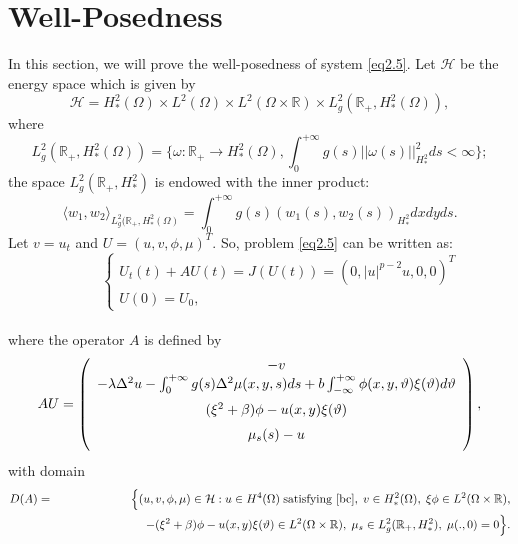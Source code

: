 \documentclass[12pt]{article}
\numberwithin{equation}{section}
\begin{document}
\section{Well-Posedness}
In this section, we will prove the well-posedness of system \eqref{eq2.5}.
Let $\mathcal{H}$ be the energy space which is given by
$$
\mathcal{H}=H^2_{*}(\Omega) \times L^{2}(\Omega) \times L^{2}(\Omega \times \mathbb{R}) \times L_g^2 (\mathbb{R}_+, H^2_{*} (\Omega)),
$$
where
$$
L_g^2 (\mathbb{R}_+, H^2_{*} (\Omega)) = \Biggl\{\omega : \mathbb{R}_+ \to H^2_{*} (\Omega), \int_{0}^{+\infty} g(s) ||\omega(s)||^2_{H^2_{*}} ds < \infty    \Biggl\};
$$
the space $L_g^2 (\mathbb{R}_+, H^2_{*})$ is endowed with the inner product:
$$
\bigl \langle w_1,w_2 \bigr \rangle_{L_g^2 (\mathbb{R}_+, H^2_{*} (\Omega)} =  \int_{0}^{+\infty} g(s) ( w_1 (s),  w_2 (s))_{H^2_{*}} dx dy ds.
$$
Let $v=u_t$ and $U = (u,v,\phi,\mu)^T.$ So, problem \eqref{eq2.5} can be written as:\\
 \vspace{4mm}
 \hspace{20mm}
 \begin{equation}
 \quad \quad \quad  \left\{
\begin{array}{lr}
U_t(t) + AU(t) = J(U(t))= (0, |u|^{p-2} u, 0, 0)^{T} \\
U(0) = U_0,
\label{A1}
\end{array}
\right.
\end{equation}
\\where the operator ${A}$ is defined by
\vspace{-.5 em}
\begin{equation}\label{eq3.2}
 AU = \left( \begin{array}{c}
-v \\
\vspace{2mm}
-\lambda \Delta^2 u -\int_{0}^{+\infty} g(s) \Delta^2 \mu (x,y,s) d s + b \int_{-\infty}^{+\infty} \phi(x,y,\vartheta) \xi(\vartheta) d\vartheta \\
\vspace{2mm}
(\xi^2 + \beta) \phi - u(x,y) \xi(\vartheta)\\
\vspace{2mm}
\mu_s (s)-u \end{array} \right),
\end{equation}
  with domain
\begin{eqnarray*}
D({A})&=&\Big\{(u, v, \phi, \mu)\in\mathcal{H}: u\in H^4(\Omega)\; \text{satisfying } \eqref{bc},\; v\in H^2_{*}(\Omega),\; \xi \phi\in L^2(\Omega\times\mathbb{R}),\\
 &&\hspace{2.5cm}-({\xi^2} + {\beta})\phi - u(x,y) \xi(\vartheta)\in L^2(\Omega\times\mathbb{R}),\; \mu_{s}\in L_g^2 (\mathbb{R}_+, H^2_{*}), \; \mu(., 0)=0  \Big\}.
\end{eqnarray*}
\end{document}
